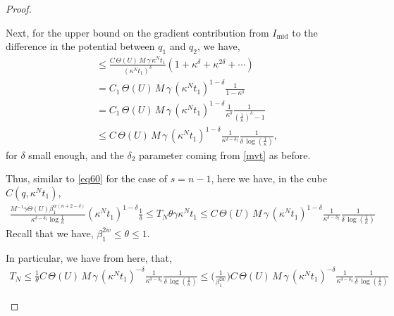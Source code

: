\documentclass{article}
\theoremstyle{plain}
\theoremstyle{plain}
\newcommand{\thee}{\Theta(U)}
\theoremstyle{definition}
\theoremstyle{plain}
\begin{document}
\begin{proof}
\begin{itemize}
Next, for the upper bound on the gradient contribution from $I_{\text{mid}}$ to the difference in the potential
between $q_1$ and $q_2$, we have,
\begin{align}
&\leq
\frac{C\,\Theta(U)\,M\,\gamma\,\kappa^{N} t_1}{(\kappa^{N} t_1)^{\delta}}
\left(1+\kappa^{\delta}+\kappa^{2\delta}+\cdots\right) \\
&= C_1\,\Theta(U)\,M\,\gamma\,(\kappa^{N} t_1)^{1-\delta}
\frac{1}{1-\kappa^{\delta}} \\
&= C_1\,\Theta(U)\,M\,\gamma\,(\kappa^{N} t_1)^{1-\delta}
\frac{1}{\kappa^{\delta}}
\frac{1}{(\tfrac{1}{\kappa})^{\delta}-1} \\
&\leq
C\,\Theta(U)\,M\,\gamma\,(\kappa^{N} t_1)^{1-\delta}
\frac{1}{\kappa^{\delta-\delta_2}}
\frac{1}{\delta\,\log(\tfrac{1}{\kappa})},
\end{align}
for $\delta$ small enough, and the $\delta_2$ parameter coming from \cref{mvt} as before.

Thus, similar to \cref{eq60} for the case of $s=n-1$, here we have, in the cube \( C(q, \kappa^{N} t_1) \),
\begin{align}\label{eq1055}
 \frac{M^{-1}\gamma\thee\beta_1^{w(n+2-\delta)}}{\kappa^{\delta-\delta_2 }\log \frac{1}{\kappa}}
(\kappa^N t_1)^{1-\delta}\frac{1}{\delta}\leq T_N \theta \gamma \kappa^{N}t_1  \leq C\,\Theta(U)\,M\,\gamma\,(\kappa^{N} t_1)^{1-\delta}
\frac{1}{\kappa^{\delta-\delta_2}}
\frac{1}{\delta\,\log(\tfrac{1}{\kappa})}
\end{align}
Recall that we have, $\beta_1^{2w}\le \theta \le 1$.

In particular, we have from here, that,
\begin{align}
    T_N\leq\frac{1}{\theta}C\,\Theta(U)\,M\,\gamma\,(\kappa^{N} t_1)^{-\delta}
\frac{1}{\kappa^{\delta-\delta_2}}
\frac{1}{\delta\,\log(\tfrac{1}{\kappa})} \leq  \Big(\frac{1}{\beta_{1}^{2w}}\Big)C\,\Theta(U)\,M\,\gamma\,(\kappa^{N} t_1)^{-\delta}
\frac{1}{\kappa^{\delta-\delta_2}}
\frac{1}{\delta\,\log(\tfrac{1}{\kappa})}
\end{align}



\end{itemize}
\end{proof}
\end{document}
